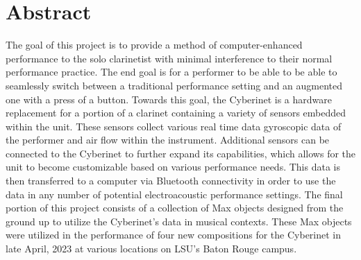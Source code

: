 \tableofcontents



 \listoffigures


\chapter{Abstract}


The goal of this project is to provide a method of computer-enhanced performance to the solo clarinetist with minimal interference to their normal performance practice. The end goal is for a performer to be able to be able to seamlessly switch between a traditional performance setting and an augmented one with a press of a button. Towards this goal, the Cyberinet is a hardware replacement for a portion of a clarinet containing a variety of sensors embedded within the unit. These sensors collect various real time data gyroscopic data of the performer and air flow within the instrument. Additional sensors can be connected to the Cyberinet to further expand its capabilities, which allows for the unit to become customizable based on various performance needs. This data is then transferred to a computer via Bluetooth connectivity in order to use the data in any number of potential electroacoustic performance settings. The final portion of this project consists of a collection of Max objects designed from the ground up to utilize the Cyberinet’s data in musical contexts. These Max objects were utilized in the performance of four new compositions for the Cyberinet in late April, 2023 at various locations on LSU's Baton Rouge campus.

\mainmatter





